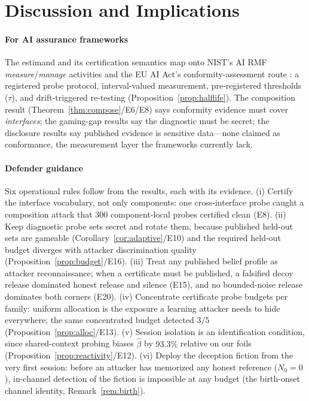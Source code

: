\section{Discussion and Implications}\label{sec:discussion}

\paragraph{For AI assurance frameworks}
The estimand and its certification semantics map onto NIST's AI RMF
\emph{measure}/\emph{manage} activities \cite{nist2023} and the EU AI
Act's conformity-assessment route \cite{euaiact2024}: a registered probe
protocol, interval-valued measurement, pre-registered thresholds ($\tau$),
and drift-triggered re-testing (Proposition~\ref{prop:halflife}). The composition result
(Theorem~\ref{thm:compose}/E6/E8) says conformity evidence must cover
\emph{interfaces}; the gaming-gap results say the diagnostic must be
secret; the disclosure results say published evidence is sensitive
data---none claimed as conformance, the measurement layer the frameworks
currently lack.

\paragraph{Defender guidance}
Six operational rules follow from the results, each with its evidence.
(i) Certify the interface vocabulary, not only components: one
cross-interface probe caught a composition attack that 300 component-local
probes certified clean (E8). (ii) Keep diagnostic probe sets secret and
rotate them, because published held-out sets are gameable
(Corollary~\ref{cor:adaptive}/E10) and the required held-out budget
diverges with attacker discrimination quality
(Proposition~\ref{prop:budget}/E16). (iii) Treat any published belief
profile as attacker reconnaissance; when a certificate must be published, a
falsified decoy release dominated honest release and silence (E15), and no
bounded-noise release dominates both corners (E20). (iv) Concentrate certificate probe
budgets per family: uniform allocation is the exposure a learning attacker
needs to hide everywhere; the same concentrated budget detected $3/5$
(Proposition~\ref{prop:alloc}/E13).
(v) Session isolation is an identification condition, since shared-context
probing biases $\hat\beta$ by $93.3\%$ relative on our foils
(Proposition~\ref{prop:reactivity}/E12). (vi) Deploy the deception fiction
from the very first session: before an attacker has memorized any honest
reference ($N_0=0$), in-channel detection of the fiction is impossible at
any budget
(the birth-onset channel identity, Remark~\ref{rem:birth}).

